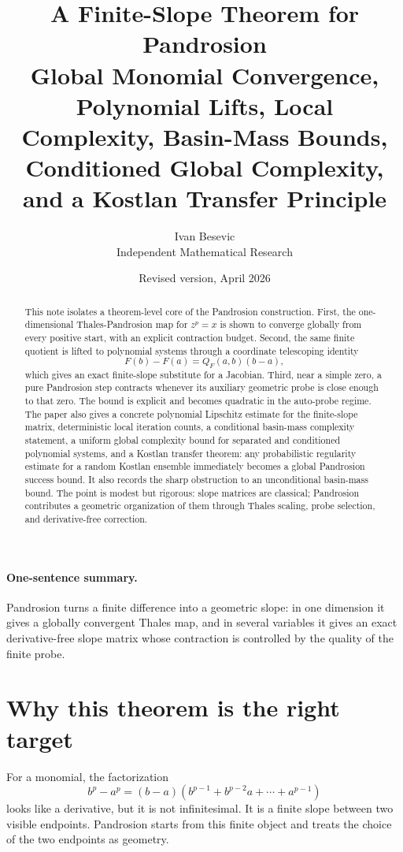 \documentclass[11pt]{article}
\title{A Finite-Slope Theorem for Pandrosion\\
\large Global Monomial Convergence, Polynomial Lifts, Local Complexity, Basin-Mass Bounds, Conditioned Global Complexity, and a Kostlan Transfer Principle}
\author{Ivan Besevic\\
\small Independent Mathematical Research}
\date{Revised version, April 2026}
\theoremstyle{definition}
\theoremstyle{remark}
\begin{document}
\maketitle

\begin{abstract}
This note isolates a theorem-level core of the Pandrosion construction.  First, the one-dimensional Thales-Pandrosion map for $z^p=x$ is shown to converge globally from every positive start, with an explicit contraction budget.  Second, the same finite quotient is lifted to polynomial systems through a coordinate telescoping identity
\[
        F(b)-F(a)=Q_F(a,b)(b-a),
\]
which gives an exact finite-slope substitute for a Jacobian.  Third, near a simple zero, a pure Pandrosion step contracts whenever its auxiliary geometric probe is close enough to that zero.  The bound is explicit and becomes quadratic in the auto-probe regime.  The paper also gives a concrete polynomial Lipschitz estimate for the finite-slope matrix, deterministic local iteration counts, a conditional basin-mass complexity statement, a uniform global complexity bound for separated and conditioned polynomial systems, and a Kostlan transfer theorem: any probabilistic regularity estimate for a random Kostlan ensemble immediately becomes a global Pandrosion success bound. It also records the sharp obstruction to an unconditional basin-mass bound.  The point is modest but rigorous: slope matrices are classical; Pandrosion contributes a geometric organization of them through Thales scaling, probe selection, and derivative-free correction.
\end{abstract}

\paragraph{One-sentence summary.}
Pandrosion turns a finite difference into a geometric slope: in one dimension it gives a globally convergent Thales map, and in several variables it gives an exact derivative-free slope matrix whose contraction is controlled by the quality of the finite probe.

\section{Why this theorem is the right target}

For a monomial, the factorization
\[
        b^p-a^p=(b-a)(b^{p-1}+b^{p-2}a+\cdots+a^{p-1})
\]
looks like a derivative, but it is not infinitesimal.  It is a finite slope between two visible endpoints.  Pandrosion starts from this finite object and treats the choice of the two endpoints as geometry.
\end{document}
